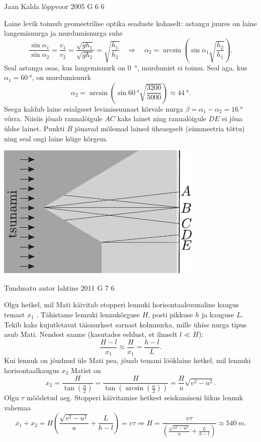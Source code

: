 \documentclass[11pt, twoside]{article}
\begin{document}
{%
{Jaan Kalda} %
{lõppvoor} %
{2005} %
{G 6} %
{6} %
{

\ifSolution
Laine levik toimub geomeetrilise optika seaduste kohaselt: astangu juures on laine langemisnurga ja murdumisnurga suhe
\[
\frac{\sin \alpha_{1}}{\sin \alpha_{2}}=\frac{v_{1}}{v_{2}}=\frac{\sqrt{g h_{1}}}{\sqrt{g h_{2}}}=\sqrt{\frac{h_{1}}{h_{2}}} \quad\Rightarrow\quad \alpha_{2}=\arcsin \left(\sin \alpha_{1} \sqrt{\frac{h_{2}}{h_{1}}}\right).
\]
Seal astangu osas, kus langemisnurk on \SI{0}{\degree}, murdumist ei toimu. Seal aga, kus $\alpha_1 = \SI{60}{\degree}$, on murdumisnurk
\[
\alpha_{2}=\arcsin \left(\sin \SI{60}{\degree} \sqrt{\frac{3200}{5000}}\right) \approx \SI{44}{\degree}.
\]
Seega kaldub laine esialgsest levimissuunast kõrvale nurga $\beta = \alpha_1 -\alpha_2 = \SI{16}{\degree}$ võrra. Niisiis jõuab rannalõigule $AC$ kaks lainet ning rannalõigule $DE$ ei jõua üldse lainet. Punkti $B$ jõuavad mõlemad lained üheaegselt (sümmeetria tõttu) ning seal ongi laine kõige kõrgem.

\begin{center}
	\includegraphics[width=0.6\linewidth]{2005-v3g-06-lah}
\end{center}
\fi
}

{Tundmatu autor} %
{lahtine} %
{2011} %
{G 7} %
{6} %
{

\ifSolution
Olgu hetkel, mil Mati käivitab stopperi lennuki horisontaalsuunaline kaugus
temast $x_{1}$ . Tähistame lennuki lennukõrguse $H$, posti pikkuse $h$ ja
kauguse
$L$. Tekib kaks kujutletavat täisnurkset sarnast kolmnurka, mille ühise nurga
tipus asub Mati. Nendest saame (kasutades eeldust, et ilmselt $l\ll H$):
\[\frac{H-l}{x_{1}}\approx\frac{H}{x_{1}}=\frac{h-l}{L}. \]
Kui lennuk on jõudnud üle Mati pea, jõuab temani lööklaine hetkel, mil lennuki horisontaalkaugus $x_{2}$ Matist on
\[ x_{2}=\frac{H}{\tan\left(\frac{\alpha}{2}\right)}=\frac{H}{\tan\left(\arcsin\left(\frac{\alpha}{2}\right)\right)}=\frac{H}{u}\sqrt{v^2-u^2}.
\]
Olgu $\tau$ mõõdetud aeg. Stopperi käivitamise hetkest seiskamiseni liikus lennuk vahemaa
\[ x_1+x_2=H\left(\frac{\sqrt{v^2-u^2}}{u} +\frac{L}{h-l}\right)=v\tau
\Rightarrow
H=\frac{v\tau}{\left(\frac{\sqrt{v^2-u^2}}{u} +\frac{L}{h-l}\right)}\approx
\SI{540}{m}.
\]
\fi
}

}
\end{document}
